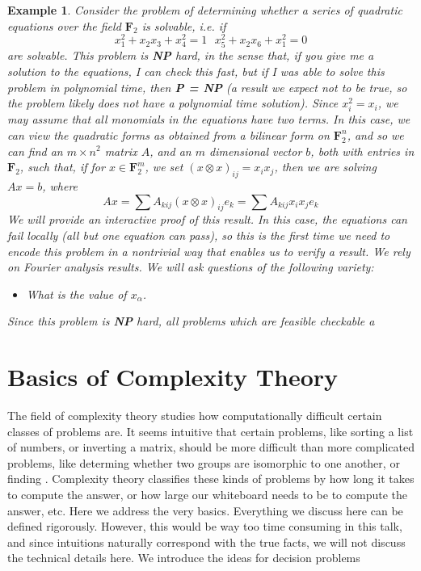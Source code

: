 \documentclass{article}
\theoremstyle{plain}
\newtheorem*{example}{Example}
\theoremstyle{definition}
\begin{document}
\begin{example}
    Consider the problem of determining whether a series of quadratic equations over the field $\mathbf{F}_2$ is solvable, i.e. if
    \[ x_1^2 + x_2x_3 + x_4^2 = 1\ \ \ x_5^2 + x_2x_6 + x_1^2 = 0 \]
    are solvable. This problem is {\bf NP} hard, in the sense that, if you give me a solution to the equations, I can check this fast, but if I was able to solve this problem in polynomial time, then {\bf P = NP} (a result we expect not to be true, so the problem likely does not have a polynomial time solution). Since $x_i^2 = x_i$, we may assume that all monomials in the equations have two terms. In this case, we can view the quadratic forms as obtained from a bilinear form on $\mathbf{F}_2^n$, and so we can find an $m \times n^2$ matrix $A$, and an $m$ dimensional vector $b$, both with entries in $\mathbf{F}_2$, such that, if for $x \in \mathbf{F}_2^m$, we set $(x \otimes x)_{ij} = x_i x_j$, then we are solving $Ax = b$, where
    \[ Ax = \sum A_{kij} (x \otimes x)_{ij} e_k = \sum A_{kij} x_i x_j e_k \]
    We will provide an interactive proof of this result. In this case, the equations can fail locally (all but one equation can pass), so this is the first time we need to encode this problem in a nontrivial way that enables us to verify a result. We rely on Fourier analysis results. We will ask questions of the following variety:
    \begin{itemize}
        \item What is the value of $x_\alpha$.
    \end{itemize}
    Since this problem is {\bf NP} hard, {\it all} problems which are feasible checkable a
\end{example}

\section{Basics of Complexity Theory}

The field of complexity theory studies how computationally difficult certain classes of problems are. It seems intuitive that certain problems, like sorting a list of numbers, or inverting a matrix, should be more difficult than more complicated problems, like determing whether two groups are isomorphic to one another, or finding . Complexity theory classifies these kinds of problems by how long it takes to compute the answer, or how large our whiteboard needs to be to compute the answer, etc. Here we address the very basics. Everything we discuss here can be defined rigorously. However, this would be way too time consuming in this talk, and since intuitions naturally correspond with the true facts, we will not discuss the technical details here. We introduce the ideas for decision problems 
\end{document}
